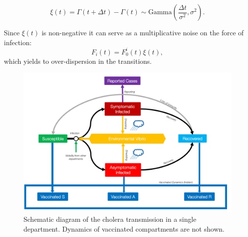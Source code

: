 \[
\xi(t) = \Gamma (t+\Delta t) - \Gamma (t) \sim \text{Gamma}\left( \frac{\Delta t}{\sigma^2}, \sigma^2\right).
\]

Since \(\xi(t)\) is non-negative it can serve as a multiplicative noise on
the force of infection: \[
F_i(t) = F^i_0(t) \xi(t),
\]
which yields to over-dispersion in the transitions.

\begin{figure}%
\begin{center}
\includegraphics{fig_cholera-haiti-ocv/compartiments.png}
\caption[Schematic diagram of the cholera transmission in a single department]{Schematic diagram of the cholera transmission in a single department. Dynamics of vaccinated compartments are not shown.}
\label{figEPFL}
\end{center}
\end{figure}

